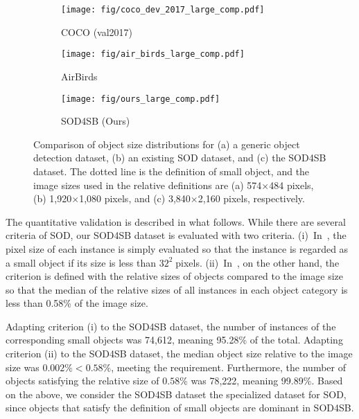 \documentclass{mva_style}
\begin{document}
\begin{figure*}[t]
    \centering
    \small
    \begin{subfigure}[b]{0.329\textwidth}
        \centering
        \texttt{[image: fig/coco\_dev\_2017\_large\_comp.pdf]}
        \caption{COCO (val2017)~\cite{COCO_ECCV2014}}
        \label{fig:coco_distribution}
    \end{subfigure}
    \hfill
    \begin{subfigure}[b]{0.329\textwidth}
        \centering
        \texttt{[image: fig/air\_birds\_large\_comp.pdf]}
        \caption{AirBirds~\cite{sun2022airbirds}}
        \label{fig:air_birds_distribution}
    \end{subfigure}
    \hfill
    \begin{subfigure}[b]{0.329\textwidth}
        \centering
        \texttt{[image: fig/ours\_large\_comp.pdf]}
        \caption{SOD4SB (Ours)}
        \label{fig:sod4sb_distribution}
    \end{subfigure}
    \caption{Comparison of object size distributions for (a) a generic object detection dataset, (b) an existing SOD dataset, and (c) the SOD4SB dataset. The dotted line is the definition of small object, and the image sizes used in the relative definitions are (a) 574$\times$484 pixels, (b) 1,920$\times$1,080 pixels, and (c) 3,840$\times$2,160 pixels, respectively.}
    \label{fig:dataset_comparison}
\end{figure*}

The quantitative validation is described in what follows.
While there are several criteria of SOD, our SOD4SB dataset is evaluated with two criteria.
(i)~In~\cite{torralba200880, zhu2016traffic}, the pixel size of each instance is simply evaluated so that the instance is regarded as a small object if its size is less than $32^{2}\;$pixels.
(ii)~In~\cite{chen2017r}, on the other hand, the criterion is defined with the relative sizes of objects compared to the image size so that the median of the relative sizes of all instances in each object category is less than 0.58\% of the image size.

Adapting criterion (i) to the SOD4SB dataset, the number of instances of the corresponding small objects was 74,612, meaning 95.28\% of the total.
Adapting criterion (ii) to the SOD4SB dataset, the median object size relative to the image size was $0.002\%<0.58\%$, meeting the requirement. Furthermore, the number of objects satisfying the relative size of $0.58\%$ was 78,222, meaning 99.89\%. Based on the above, we consider the SOD4SB dataset the specialized dataset for SOD, since objects that satisfy the definition of small objects are dominant in SOD4SB. 
\end{document}
